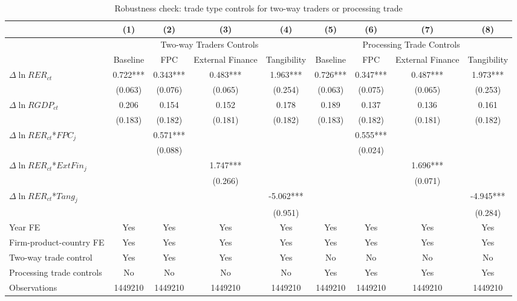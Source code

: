 \documentclass[12pt]{article}
\begin{document}
\begin{table}
	\centering
	\caption{Robustness check: trade type controls for two-way traders or processing trade}
	\begin{threeparttable}
		\begin{tabular}{lcccccccc}
			\toprule
			& (1)   & (2)   & (3)   & (4) &  (5)  &  (6)   & (7)   & (8)\\
			\midrule
			& \multicolumn{4}{c}{Two-way Traders Controls} & \multicolumn{4}{c}{Processing Trade Controls}\\
			& Baseline & FPC & External Finance & Tangibility & Baseline & FPC & External Finance & Tangibility\\
			\midrule
			$\Delta \ln RER_{ct}$ & 0.722*** & 0.343*** & 0.483*** & 1.963*** & 0.726*** & 0.347*** & 0.487*** & 1.973***\\
			& (0.063) & (0.076) & (0.065) & (0.254) & (0.063) & (0.075) & (0.065) & (0.253)\\
			$\Delta \ln RGDP_{ct}$ & 0.206 & 0.154 & 0.152 & 0.178 & 0.189 & 0.137 & 0.136 & 0.161\\
			& (0.183) & (0.182) & (0.181) & (0.182) & (0.183) & (0.182) & (0.181) & (0.182) \\
			$\Delta \ln RER_{ct}$*$FPC_{j}$ &       & 0.571*** &       &  & & 0.555*** &&\\
			&       & (0.088) &       &  &&(0.024)&&\\
			$\Delta \ln RER_{ct}$*$ExtFin_{j}$ &       &       & 1.747*** &  &&& 1.696*** &\\
			&       &       & (0.266) &  &&&(0.071)&\\
			$\Delta \ln RER_{ct}$*$Tang_{j}$ &       &       &       & -5.062*** &&&  & -4.945***\\
			&       &       &       & (0.951) &&&& (0.284)\\
			Year FE  &  Yes   & Yes   & Yes   & Yes &  Yes   & Yes   & Yes   & Yes\\
			Firm-product-country FE &  Yes   & Yes   & Yes   & Yes &  Yes   & Yes   & Yes   & Yes\\
			Two-way trade control &  Yes   & Yes   & Yes   & Yes & No & No & No & No\\
			Processing trade controls & No & No & No & No &  Yes   & Yes   & Yes  & Yes \\
			Observations & 1449210 & 1449210 & 1449210 & 1449210 & 1449210 & 1449210 & 1449210 & 1449210\\
			\bottomrule
		\end{tabular}

\end{threeparttable}
\end{table}
\end{document}
